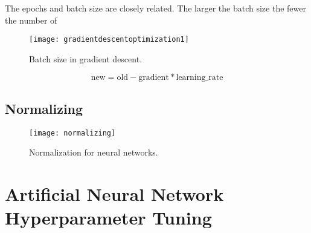 The epochs and batch size are closely related.  The larger the batch size the fewer the number of

 	\begin{figure}[h]
		\centering
		\texttt{[image: gradientdescentoptimization1]}
		\caption[Batch size in gradient descent]{Batch size in gradient descent.}
		\label{fig:gradientdescentoptimization1}
	\end{figure}

	\begin{equation}
		\textrm{new} = \textrm{old} - \textrm{gradient} * \textrm{learning\_rate}
	\end{equation}



	\subsection{Normalizing}

 	\begin{figure}[h]
		\centering
		\texttt{[image: normalizing]}
		\caption[Normalization for neural networks]{Normalization for neural networks.}
		\label{fig:normalizing}
	\end{figure}

	\section{Artificial Neural Network Hyperparameter Tuning}

